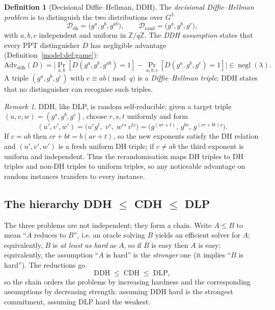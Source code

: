 \documentclass[11pt,a4paper]{article}
\theoremstyle{definition}
\newtheorem{definition}[theorem]{Definition}
\theoremstyle{remark}
\newtheorem{remark}[theorem]{Remark}
\newcommand{\Z}{\ensuremath{\mathbb{Z}}}
\DeclareMathOperator{\negl}{negl}
\begin{document}
\begin{definition}[Decisional Diffie--Hellman, DDH]
\label{assumptions:def:ddh}
The \emph{decisional Diffie--Hellman problem} is to distinguish the two distributions over \(G^3\)
\[
\mathcal{D}_{\mathrm{dh}} = \bigl(g^a, g^b, g^{ab}\bigr), \qquad
\mathcal{D}_{\mathrm{rand}} = \bigl(g^a, g^b, g^c\bigr),
\]
with \(a, b, c\) independent and uniform in \(\Z/q\Z\). The \emph{DDH assumption} states that every PPT distinguisher \(D\) has negligible advantage (Definition~\ref{model:def:game}):
\[
\mathrm{Adv}_{\mathrm{ddh}}(D) = \bigl|\Pr_{a,b}[D(g^a,g^b,g^{ab}) = 1] - \Pr_{a,b,c}[D(g^a,g^b,g^c)=1]\bigr| \in \negl(\lambda).
\]
A triple \((g^a, g^b, g^c)\) with \(c \equiv ab \pmod q\) is a \emph{Diffie--Hellman triple}; DDH states that no distinguisher can recognise such triples.
\end{definition}

\begin{remark}
\label{assumptions:rem:ddh-self-reducible}
DDH, like DLP, is random self-reducible: given a target triple \((u, v, w) = (g^a, g^b, g^c)\), choose \(r, s, t\) uniformly and form
\[
(u', v', w') = \bigl(u^{r} g^{t},\; v^{s},\; w^{rs}\, v^{t s}\bigr)
= \bigl(g^{(ar + t)},\, g^{bs},\, g^{(cr + bt)s}\bigr).
\]
If \(c = ab\) then \(cr + bt = b(ar + t)\), so the new exponents satisfy the DH relation and \((u',v',w')\) is a fresh uniform DH triple; if \(c \ne ab\) the third exponent is uniform and independent. Thus the rerandomisation maps DH triples to DH triples and non-DH triples to uniform triples, so any noticeable advantage on random instances transfers to every instance.
\end{remark}

\subsection{The hierarchy DDH \(\le\) CDH \(\le\) DLP}
\label{assumptions:subsec:hierarchy}

The three problems are not independent; they form a chain. Write \(A \le B\) to mean ``\(A\) reduces to \(B\)'', i.e. an oracle solving \(B\) yields an efficient solver for \(A\); equivalently, \(B\) is \emph{at least as hard} as \(A\), so if \(B\) is easy then \(A\) is easy; equivalently, the assumption ``\(A\) is hard'' is the \emph{stronger} one (it implies ``\(B\) is hard''). The reductions go
\[
\mathrm{DDH} \;\le\; \mathrm{CDH} \;\le\; \mathrm{DLP},
\]
so the chain orders the problems by increasing hardness and the corresponding assumptions by decreasing strength: assuming DDH hard is the strongest commitment, assuming DLP hard the weakest.
\end{document}
